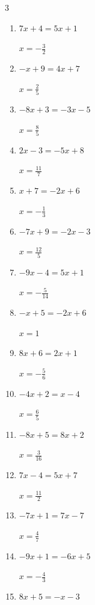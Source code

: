 \begin{multicols}{3}
\begin{enumerate}
  \item $7x+4=5x+1$

        $\displaystyle x=-\frac{3}{2}$

  \item $-x+9=4x+7$

        $\displaystyle x=\frac{2}{5}$

  \item $-8x+3=-3x-5$

        $\displaystyle x=\frac{8}{5}$

  \item $2x-3=-5x+8$

        $\displaystyle x=\frac{11}{7}$

  \item $x+7=-2x+6$

        $\displaystyle x=-\frac{1}{3}$

\columnbreak %

  \item $-7x+9=-2x-3$

        $\displaystyle x=\frac{12}{5}$

  \item $-9x-4=5x+1$

        $\displaystyle x=-\frac{5}{14}$

  \item $-x+5=-2x+6$

        $\displaystyle x=1$

  \item $8x+6=2x+1$

        $\displaystyle x=-\frac{5}{6}$

  \item $-4x+2=x-4$

        $\displaystyle x=\frac{6}{5}$

  \item $-8x+5=8x+2$

        $\displaystyle x=\frac{3}{16}$

  \item $7x-4=5x+7$

        $\displaystyle x=\frac{11}{2}$

  \item $-7x+1=7x-7$

        $\displaystyle x=\frac{4}{7}$

  \item $-9x+1=-6x+5$

        $\displaystyle x=-\frac{4}{3}$

  \item $8x+5=-x-3$


\end{enumerate}
\end{multicols}

